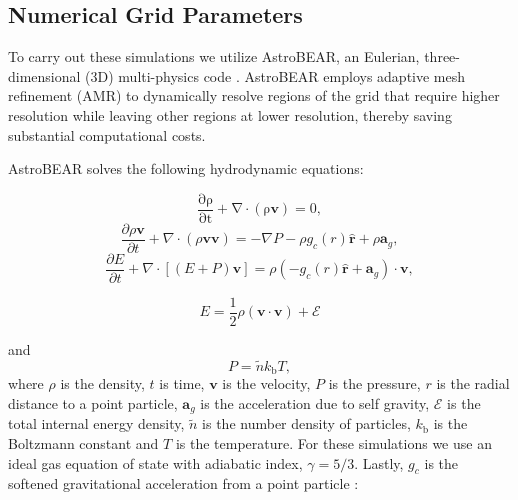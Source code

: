 \documentclass[fleqn,usenatbib]{mnras}
\begin{document}
\subsection{Numerical Grid Parameters}

To carry out these simulations we utilize AstroBEAR, an Eulerian, three-dimensional (3D) multi-physics code \citep{Cunningham_2009,CARROLLNELLENBACK_2013}. AstroBEAR employs adaptive mesh refinement (AMR) to dynamically resolve regions of the grid that require higher resolution while leaving other regions at lower resolution, thereby saving substantial computational costs.

AstroBEAR solves the following hydrodynamic equations: 

\begin{equation}
    \mathrm{\frac{\partial \rho}{\partial t} + \nabla \cdot (\rho \mathbf{v}) = 0},
\end{equation}
\begin{equation}
     \frac{\partial \rho \mathbf{v}}{\partial t} + \nabla \cdot (\rho \mathbf{v v}) = -\nabla P - \rho g_c(r) \hat{\textbf{r}} + \rho \textbf{a}_g,
\end{equation}
\begin{equation}
    \frac{\partial E}{\partial t} + \nabla \cdot [(E + P)\mathbf{v}] = \rho(-g_c(r) \hat{\textbf{r}} +  \textbf{a}_g)\cdot \mathbf{v},
\end{equation}

\begin{equation}
    E = \frac{1}{2}\rho(\mathbf{v\cdot v}) + \mathcal{E}
\end{equation} 

and
\begin{equation}
     P = \tilde{n} k_\mathrm{b} T,
\end{equation}
where $\rho$ is the density, $t$ is time, $\mathbf{v}$ is the velocity, $P$ is the pressure, $r$ is the radial distance to a point particle, $\textbf{a}_g$ is the acceleration due to self gravity, $\mathcal{E}$ is the total internal energy density, $\tilde{n}$ is the number density of particles, $k_\mathrm{b}$ is the Boltzmann constant and $T$ is the temperature. For these simulations we use an ideal gas equation of state with adiabatic index, $\gamma = 5/3$. Lastly, $g_c$ is the softened gravitational acceleration from a point particle :
\end{document}
